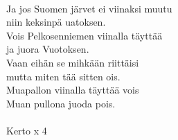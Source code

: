 \hspace{10mm} \\
            Ja jos Suomen järvet ei viinaksi muutu \\
            niin keksinpä uatoksen. \\
            Vois Pelkosenniemen viinalla täyttää \\
            ja juora Vuotoksen. \\
            Vaan eihän se mihkään riittäisi \\
            mutta miten tää sitten ois. \\
            Muapallon viinalla täyttää vois \\
            Muan pullona juoda pois. \\
\hspace{10mm} \\
            Kerto x 4 \\
             \\
\hspace{10mm} \\
 \\
\hspace{10mm} \\
